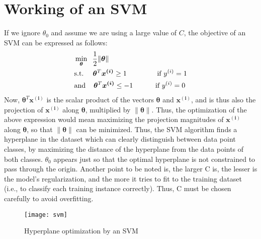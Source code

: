 \documentclass[a4paper, 12pt]{report}
\begin{document}
\section{Working of an SVM}
If we ignore $\theta_0$ and assume we are using a large value of $C$, the objective of an SVM can be expressed as follows:
\begin{align*}
&\min_{\bm{\theta}} \hspace{2mm} \dfrac{1}{2}\lVert\bm{\theta}\rVert \\
&\text{s.t. } \hspace{3mm} \bm{\theta}^T\bm{x^{\left(i\right)}} \geq 1 \hspace{1.4cm} \text{ if } y^{\left(i\right)} = 1 \\
&\text{and} \hspace{4mm} \bm{\theta}^T\bm{x^{\left(i\right)}} \leq -1 \hspace{1cm} \text{ if } y^{\left(i\right)} = 0
\end{align*}
Now, $\bm{\theta}^T\bm{x^{\left(i\right)}}$ is the scalar product of the vectors $\bm{\theta}$ and $\bm{x^{\left(i\right)}}$, and is thus also the projection of $\bm{x^{\left(i\right)}}$ along $\bm{\theta}$, multiplied by $\lVert\bm{\theta}\rVert$. Thus, the optimization of the above expression would mean maximizing the projection magnitudes of $\bm{x^{\left(i\right)}}$ along $\bm{\theta}$, so that $\lVert\bm{\theta}\rVert$ can be minimized. Thus, the SVM algorithm finds a hyperplane in the dataset which can clearly distinguish between data point classes, by maximizing the distance of the hyperplane from the data points of both classes. $\theta_0$ appears just so that the optimal hyperplane is not constrained to pass through the origin. Another point to be noted is, the larger C is, the lesser is the model's regularization, and the more it tries to fit to the training dataset (i.e., to classify each training instance correctly). Thus, C must be chosen carefully to avoid overfitting.
\begin{figure}[H]
\centering
\texttt{[image: svm]}
\caption{Hyperplane optimization by an SVM}
\end{figure}
\end{document}
